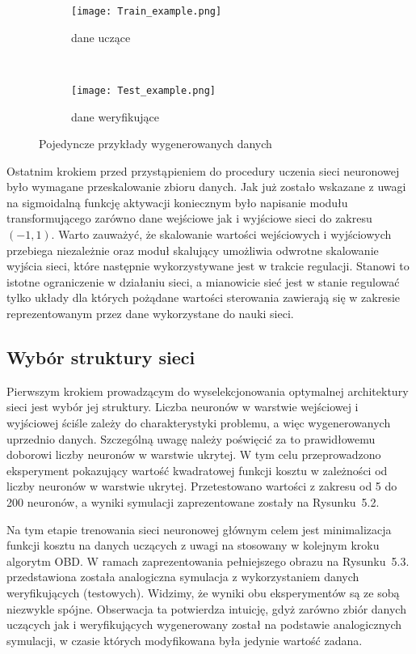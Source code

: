 \begin{figure}[!htb]
    \centering
    \begin{subfigure}[t]{0.5\textwidth}
        \centering
        \texttt{[image: Train\_example.png]}
        \caption{dane uczące}
    \end{subfigure}%
    ~ 
    \begin{subfigure}[t]{0.5\textwidth}
        \centering
        \texttt{[image: Test\_example.png]}
        \caption{dane weryfikujące}
    \end{subfigure}
    \caption{Pojedyncze przykłady wygenerowanych danych}
\end{figure}

\par Ostatnim krokiem przed przystąpieniem do procedury uczenia sieci neuronowej było wymagane przeskalowanie zbioru danych. Jak już zostało wskazane z uwagi na sigmoidalną funkcję aktywacji koniecznym było napisanie modułu transformującego  zarówno dane wejściowe jak i wyjściowe sieci do zakresu \( (-1,1) \). Warto zauważyć, że skalowanie wartości wejściowych i wyjściowych przebiega niezależnie oraz moduł skalujący umożliwia odwrotne skalowanie wyjścia sieci, które następnie wykorzystywane jest w trakcie regulacji. Stanowi to istotne ograniczenie w działaniu sieci, a mianowicie sieć jest w stanie regulować tylko układy dla których pożądane wartości sterowania zawierają się w zakresie reprezentowanym przez dane wykorzystane do nauki sieci.  

\subsection{Wybór struktury sieci}
Pierwszym krokiem prowadzącym do wyselekcjonowania optymalnej architektury sieci jest wybór jej struktury. Liczba neuronów w warstwie wejściowej i wyjściowej ściśle zależy do charakterystyki problemu, a więc wygenerowanych uprzednio danych. Szczególną uwagę należy poświęcić za to prawidłowemu doborowi liczby neuronów w warstwie ukrytej. W tym celu przeprowadzono eksperyment pokazujący wartość kwadratowej funkcji kosztu w zależności od liczby neuronów w warstwie ukrytej. Przetestowano wartości z zakresu od 5 do 200 neuronów, a wyniki symulacji zaprezentowane zostały na Rysunku~5.2. 
\par Na tym etapie trenowania sieci neuronowej głównym celem jest minimalizacja funkcji kosztu na danych uczących z uwagi na  stosowany w kolejnym kroku algorytm OBD. W ramach zaprezentowania pełniejszego obrazu na Rysunku~5.3. przedstawiona została analogiczna symulacja z wykorzystaniem danych weryfikujących (testowych). Widzimy, że wyniki obu eksperymentów są ze sobą niezwykle spójne. Obserwacja ta potwierdza intuicję, gdyż zarówno zbiór danych uczących jak i weryfikujących wygenerowany został na podstawie analogicznych symulacji, w czasie których modyfikowana była jedynie wartość zadana. 

